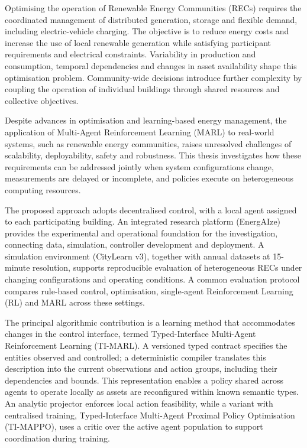 
Optimising the operation of Renewable Energy Communities (RECs) requires the coordinated management of distributed generation, storage and flexible demand, including electric-vehicle charging. The objective is to reduce energy costs and increase the use of local renewable generation while satisfying participant requirements and electrical constraints. Variability in production and consumption, temporal dependencies and changes in asset availability shape this optimisation problem. Community-wide decisions introduce further complexity by coupling the operation of individual buildings through shared resources and collective objectives.

Despite advances in optimisation and learning-based energy management, the application of Multi-Agent Reinforcement Learning (MARL) to real-world systems, such as renewable energy communities, raises unresolved challenges of scalability, deployability, safety and robustness. This thesis investigates how these requirements can be addressed jointly when system configurations change, measurements are delayed or incomplete, and policies execute on heterogeneous computing resources.

The proposed approach adopts decentralised control, with a local agent assigned to each participating building. An integrated research platform (EnergAIze) provides the experimental and operational foundation for the investigation, connecting data, simulation, controller development and deployment. A simulation environment (CityLearn v3), together with annual datasets at 15-minute resolution, supports reproducible evaluation of heterogeneous RECs under changing configurations and operating conditions. A common evaluation protocol compares rule-based control, optimisation, single-agent Reinforcement Learning (RL) and MARL across these settings.

The principal algorithmic contribution is a learning method that accommodates changes in the control interface, termed Typed-Interface Multi-Agent Reinforcement Learning (TI-MARL). A versioned typed contract specifies the entities observed and controlled; a deterministic compiler translates this description into the current observations and action groups, including their dependencies and bounds. This representation enables a policy shared across agents to operate locally as assets are reconfigured within known semantic types. An analytic projector enforces local action feasibility, while a variant with centralised training, Typed-Interface Multi-Agent Proximal Policy Optimisation (TI-MAPPO), uses a critic over the active agent population to support coordination during training.

